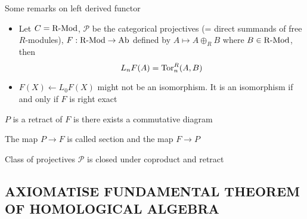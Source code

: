 \documentclass{report}
\begin{document}
\begin{remark}
    Some remarks on left derived functor
    \begin{itemize}
        \item Let $C = \operatorname{R-Mod}$, $\mathcal{P}$ be the categorical projectives (= direct summands of free $R$-modules), $F: \operatorname{R-Mod} \to \operatorname{Ab}$ defined by $A \mapsto A \oplus_R B$ where $B \in \operatorname{R-Mod}$, then 
        $$
            L_n F(A) = \operatorname{Tor}^R_n(A, B)
        $$

        \item $F(X) \leftarrow L_0 F(X)$ might not be an isomorphism. It is an isomorphism if and only if $F$ is right exact
    \end{itemize}
\end{remark}

\begin{definition}[retract]
    $P$ is a retract of $F$ is there exists a commutative diagram
    \begin{center}
    \end{center}
    The map $P \to F$ is called section and the map $F \to P$ 
\end{definition}

\begin{proposition}
    Class of projectives $\mathcal{P}$ is closed under coproduct and retract
\end{proposition}

\subsection{AXIOMATISE FUNDAMENTAL THEOREM OF HOMOLOGICAL ALGEBRA}
\end{document}
